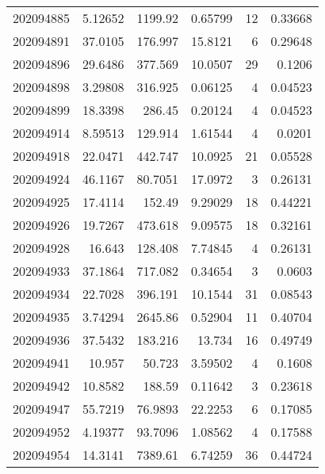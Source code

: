 \begin{tabular}{rrrrrr}
 202094885 &          5.12652 &     1199.92   &            0.65799 &          12 & 0.33668 \\
 202094891 &         37.0105  &      176.997  &           15.8121  &           6 & 0.29648 \\
 202094896 &         29.6486  &      377.569  &           10.0507  &          29 & 0.1206  \\
 202094898 &          3.29808 &      316.925  &            0.06125 &           4 & 0.04523 \\
 202094899 &         18.3398  &      286.45   &            0.20124 &           4 & 0.04523 \\
 202094914 &          8.59513 &      129.914  &            1.61544 &           4 & 0.0201  \\
 202094918 &         22.0471  &      442.747  &           10.0925  &          21 & 0.05528 \\
 202094924 &         46.1167  &       80.7051 &           17.0972  &           3 & 0.26131 \\
 202094925 &         17.4114  &      152.49   &            9.29029 &          18 & 0.44221 \\
 202094926 &         19.7267  &      473.618  &            9.09575 &          18 & 0.32161 \\
 202094928 &         16.643   &      128.408  &            7.74845 &           4 & 0.26131 \\
 202094933 &         37.1864  &      717.082  &            0.34654 &           3 & 0.0603  \\
 202094934 &         22.7028  &      396.191  &           10.1544  &          31 & 0.08543 \\
 202094935 &          3.74294 &     2645.86   &            0.52904 &          11 & 0.40704 \\
 202094936 &         37.5432  &      183.216  &           13.734   &          16 & 0.49749 \\
 202094941 &         10.957   &       50.723  &            3.59502 &           4 & 0.1608  \\
 202094942 &         10.8582  &      188.59   &            0.11642 &           3 & 0.23618 \\
 202094947 &         55.7219  &       76.9893 &           22.2253  &           6 & 0.17085 \\
 202094952 &          4.19377 &       93.7096 &            1.08562 &           4 & 0.17588 \\
 202094954 &         14.3141  &     7389.61   &            6.74259 &          36 & 0.44724 \\

\end{tabular}
